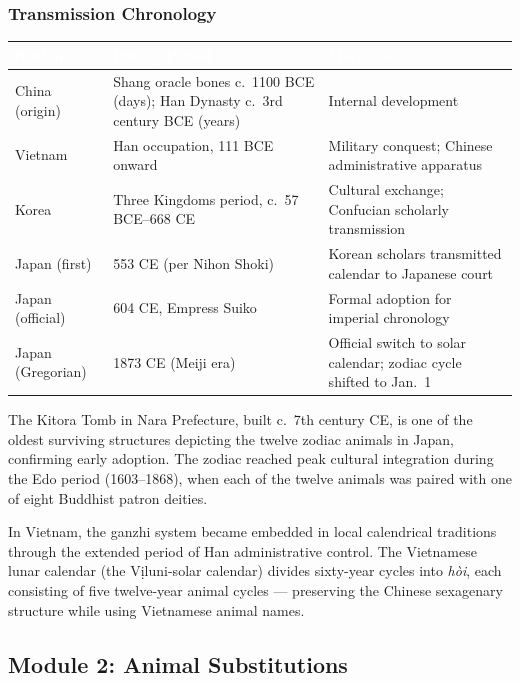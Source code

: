 \documentclass[11pt,letterpaper]{article}
\newcommand{\tableheader}[1]{\textbf{\sffamily\textcolor{white}{#1}}}
\begin{document}
\subsubsection{Transmission Chronology}

\begin{center}
\begin{tabularx}{\textwidth}{L{2.5cm}L{3.5cm}X}
\toprule
{}
\tableheader{Nation} & \tableheader{Date / Period} & \tableheader{Mechanism} \\
\midrule
China (origin) & Shang oracle bones c.\ 1100 BCE (days); Han Dynasty c.\ 3rd century BCE (years) & Internal development \\
Vietnam & Han occupation, 111 BCE onward & Military conquest; Chinese administrative apparatus \\
Korea & Three Kingdoms period, c.\ 57 BCE--668 CE & Cultural exchange; Confucian scholarly transmission \\
Japan (first) & 553 CE (per Nihon Shoki) & Korean scholars transmitted calendar to Japanese court \\
Japan (official) & 604 CE, Empress Suiko & Formal adoption for imperial chronology \\
Japan (Gregorian) & 1873 CE (Meiji era) & Official switch to solar calendar; zodiac cycle shifted to Jan.\ 1 \\
\bottomrule
\end{tabularx}
\end{center}

The Kitora Tomb in Nara Prefecture, built c.\ 7th century CE, is one of the oldest surviving structures depicting the twelve zodiac animals in Japan, confirming early adoption. The zodiac reached peak cultural integration during the Edo period (1603--1868), when each of the twelve animals was paired with one of eight Buddhist patron deities.

In Vietnam, the ganzhi system became embedded in local calendrical traditions through the extended period of Han administrative control. The Vietnamese lunar calendar (the Vi\d\ectt luni-solar calendar) divides sixty-year cycles into \textit{h\`oi}, each consisting of five twelve-year animal cycles --- preserving the Chinese sexagenary structure while using Vietnamese animal names.

\subsection{Module 2: Animal Substitutions}
\end{document}
